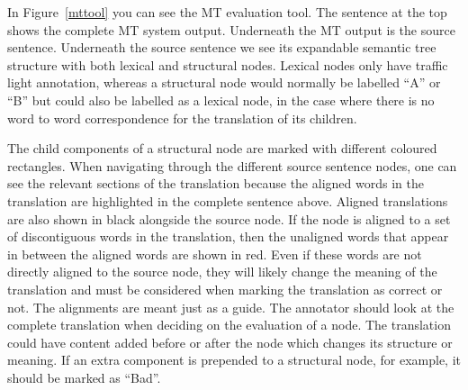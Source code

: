 \documentclass[11pt]{article}
\begin{document}
In Figure~\ref{mttool} you can see the MT evaluation tool. The sentence at the top shows the complete MT system output. Underneath the MT output is the  source sentence.  Underneath the source sentence we see its expandable semantic tree structure with both lexical and structural nodes. Lexical nodes only have traffic light annotation, whereas a structural node would normally be labelled ``A'' or ``B'' but could also be labelled as a lexical node, in the case where there is no word to word correspondence for the translation of its children.

 The child components of a structural node are marked with different coloured rectangles. When navigating through the different source sentence nodes, one can see the relevant sections of the translation because the aligned words in the translation are highlighted in the complete sentence above. Aligned translations are also shown in black alongside the source node. If the node is aligned to a set of discontiguous words in the translation, then the unaligned words that appear in between the aligned words are shown in red. Even if these words are not directly aligned to the source node, they 
will likely change the meaning of the translation and must be considered when marking 
the translation as correct or not. The alignments are meant just as a guide. The annotator should  look at the complete translation when deciding on the evaluation of a node. The translation could have content added before or after the node which changes its
 structure or meaning. If an extra component is prepended to a structural node, for example, it should be marked as ``Bad''.

%
%
% 
%
\end{document}
